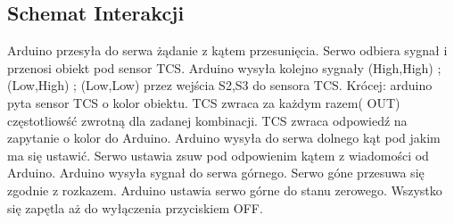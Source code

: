 \documentclass[12pt]{article}
\begin{document}
\subsection{Schemat Interakcji}
Arduino przesyła do serwa żądanie z kątem przesunięcia. Serwo odbiera sygnał i przenosi obiekt pod sensor TCS. Arduino wysyła kolejno sygnały (High,High) ; (Low,High) ; (Low,Low)  przez wejścia S2,S3 do sensora TCS. Krócej: arduino pyta sensor TCS o kolor obiektu. TCS zwraca za każdym razem( OUT) częstotliowść zwrotną dla zadanej kombinacji. TCS zwraca odpowiedź na zapytanie o kolor do Arduino. Arduino wysyła do serwa dolnego kąt pod jakim ma się ustawić. Serwo ustawia zsuw pod odpowienim kątem z wiadomości od Arduino. Arduino wysyła sygnał do serwa górnego. Serwo góne przesuwa się zgodnie z rozkazem. Arduino ustawia serwo górne do stanu zerowego. Wszystko się zapętla aż do wyłączenia przyciskiem OFF.
\end{document}
